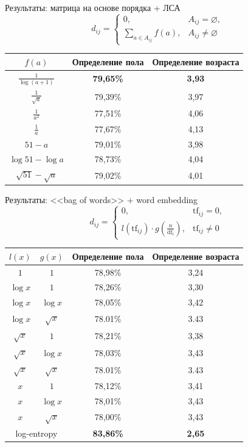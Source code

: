 \documentclass{beamer}
\begin{document}
\begin{frame}{Результаты: матрица на основе порядка + ЛСА}
    \[d_{ij} = \begin{cases}
              0,& A_{ij} = \varnothing,\\
              \sum\limits_{a \in A_{ij}}{f(a)},& A_{ij} \ne \varnothing
          \end{cases}\]
\begin{table}[!h]
\centering
\begin{tabular}{|c|c|c|}\hline
    \boldmath$f(a)$ & \textbf{Определение пола} & \textbf{Определение возраста} \\\hline
    $\frac{1}{\log(a + 1)}$ & \textbf{79,65\%} & \textbf{3,93} \\\hline
    $\frac{1}{\sqrt{a}}$ & 79,39\% & 3,97 \\\hline
    $\frac{1}{a^2}$ & 77,51\% & 4,06 \\\hline
    $\frac{1}{a}$ & 77,67\% & 4,13 \\\hline
    $51 - a$ & 79,01\% & 3,98 \\\hline
    $\log{51} - \log{a}$ & 78,73\% & 4,04 \\\hline
    $\sqrt{51} - \sqrt{a}$ & 79,02\% & 4,01 \\\hline
\end{tabular}
\end{table}
\end{frame}

\begin{frame}{Результаты: <<bag of words>> + word embedding}
    \[d_{ij} = \begin{cases}
              0,& \mathrm{tf}_{ij} = 0,\\
              l(\mathrm{tf}_{ij}) \cdot g(\frac{n}{\mathrm{df}_{i}}),& \mathrm{tf}_{ij} \ne 0
        \end{cases}\]
\begin{table}[!h]
\centering
\begin{tabular}{|c|c|c|c|}\hline
    \boldmath$l(x)$ & \boldmath$g(x)$ & \textbf{Определение пола} & \textbf{Определение возраста} \\\hline
    $1$ & $1$ & 78,98\% & 3,24 \\\hline
    $\log{x}$ & $1$ & 78,26\% & 3,30 \\\hline
    $\log{x}$ & $\log{x}$ & 78,05\% & 3,42 \\\hline
    $\log{x}$ & $\sqrt{x}$ & 78.01\% & 3.43 \\\hline
    $\sqrt{x}$ & $1$ & 78,21\% & 3,38 \\\hline
    $\sqrt{x}$ & $\log{x}$ & 78,03\% & 3,43 \\\hline
    $\sqrt{x}$ & $\sqrt{x}$ & 78.01\% & 3.43 \\\hline
    $x$ & $1$ & 78,12\% & 3,41 \\\hline
    $x$ & $\log{x}$ & 78,01\% & 3,43 \\\hline
    $x$ & $\sqrt{x}$ & 78,00\% & 3,43 \\\hline
    \multicolumn{2}{|c|}{log-entropy} & \textbf{83,86\%} & \textbf{2,65} \\\hline
\end{tabular}
\end{table}
\end{frame}
\end{document}
